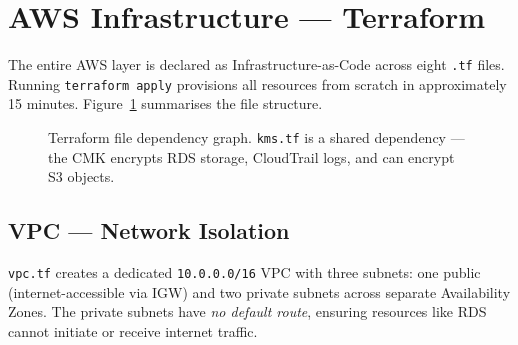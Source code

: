 \documentclass[12pt,a4paper]{article}
\begin{document}
\section{AWS Infrastructure --- Terraform}

The entire AWS layer is declared as Infrastructure-as-Code across eight
\texttt{.tf} files. Running \texttt{terraform apply} provisions all resources
from scratch in approximately 15 minutes. Figure~\ref{fig:terraform_files}
summarises the file structure.

\begin{figure}[H]
\centering
{}
\caption{Terraform file dependency graph. \texttt{kms.tf} is a shared dependency --- the CMK encrypts RDS storage, CloudTrail logs, and can encrypt S3 objects.}
\label{fig:terraform_files}
\end{figure}

\subsection{VPC --- Network Isolation}

\texttt{vpc.tf} creates a dedicated \texttt{10.0.0.0/16} VPC with three subnets:
one public (internet-accessible via IGW) and two private subnets across separate
Availability Zones. The private subnets have \emph{no default route}, ensuring
resources like RDS cannot initiate or receive internet traffic.
\end{document}
